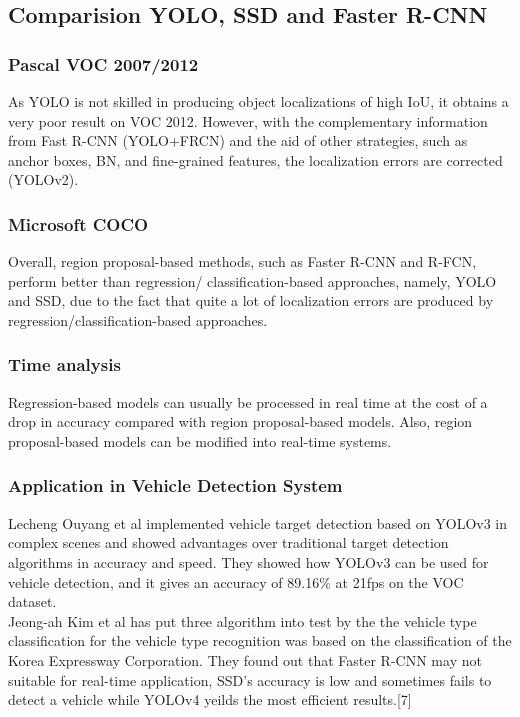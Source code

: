     \subsection{Comparision YOLO, SSD and Faster R-CNN}
        \subsubsection{Pascal VOC 2007/2012}
            As YOLO is not skilled in producing object localizations of high IoU, it obtains a very poor result on VOC 2012. However, with the complementary information from Fast R-CNN (YOLO+FRCN) and the aid of other strategies, such as anchor boxes, BN, and fine-grained features, the localization errors are corrected (YOLOv2). 
        \subsubsection{Microsoft COCO}
            Overall, region proposal-based methods, such as Faster R-CNN and R-FCN, perform better than regression/ classification-based approaches, namely, YOLO and SSD, due to the fact that quite a lot of localization errors are produced by regression/classification-based approaches.
        \subsubsection{Time analysis}
            Regression-based models can usually be processed in real time at the cost of a drop in accuracy compared with region proposal-based models. Also, region proposal-based models can be modified into real-time systems.
        \subsubsection{Application in Vehicle Detection System}
            Lecheng Ouyang et al implemented vehicle target detection based on YOLOv3 in complex scenes and showed advantages over traditional target detection algorithms in accuracy and speed. They showed how YOLOv3 can be used for vehicle detection, and it gives an accuracy of 89.16\% at 21fps on the VOC dataset. \\ 
            \vspace{3mm}
            Jeong-ah Kim et al has put three algorithm into test by the the vehicle type classification for the vehicle type recognition was based on the classification of the Korea Expressway Corporation. They found out that Faster R-CNN may not suitable for real-time application, SSD's accuracy is low and sometimes fails to detect a vehicle while YOLOv4 yeilds the most efficient results.[7] \\ 
